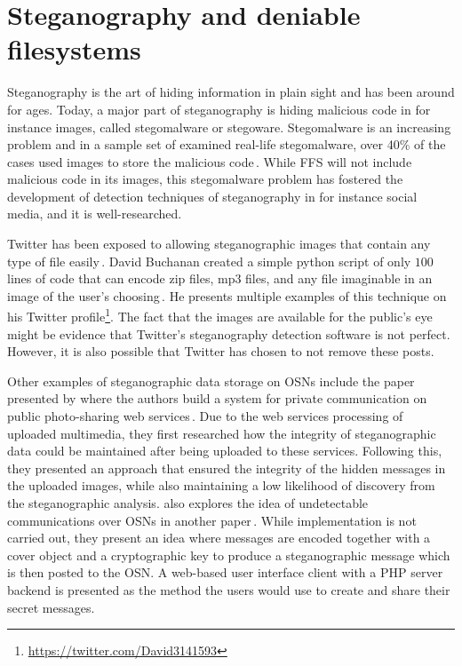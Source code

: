 \section{Steganography and deniable filesystems}
Steganography is the art of hiding information in plain sight and has been around for ages. Today, a major part of steganography is hiding malicious code in for instance images, called stegomalware or stegoware. Stegomalware is an increasing problem and in a sample set of examined \mbox{real-life} stegomalware, over 40\% of the cases used images to store the malicious code\,\cite{stichtingcuingfoundationSIMARGLStegwarePrimer2020}. While \gls{FFS} will not include malicious code in its images, this stegomalware problem has fostered the development of detection techniques of steganography in for instance social media, and it is \mbox{well-researched}. 

Twitter has been exposed to allowing steganographic images that contain any type of file easily\,\cite{TwitterImagesCan}. David Buchanan created a simple python script of only $100$ lines of code that can encode zip files, mp3 files, and any file imaginable in an image of the user's choosing\,\cite{buchananTweetablepolyglotpng2022}. He presents multiple examples of this technique on his Twitter profile\footnote{\url{https://twitter.com/David3141593}}. The fact that the images are available for the public's eye might be evidence that Twitter's steganography detection software is not perfect. However, it is also possible that Twitter has chosen to not remove these posts.

Other examples of steganographic data storage on \gls{OSN}s include the paper presented by \citeauthor{ningSecretMessageSharing2014} where the authors build a system for private communication on public \mbox{photo-sharing} web services\,\cite{ningSecretMessageSharing2014}. Due to the web services processing of uploaded multimedia, they first researched how the integrity of steganographic data could be maintained after being uploaded to these services. Following this, they presented an approach that ensured the integrity of the hidden messages in the uploaded images, while also maintaining a low likelihood of discovery from the steganographic analysis. \citeauthor{beatoUndetectableCommunicationOnline2014} also explores the idea of undetectable communications over \gls{OSN}s in another paper\,\cite{beatoUndetectableCommunicationOnline2014}. While implementation is not carried out, they present an idea where messages are encoded together with a cover object and a cryptographic key to produce a steganographic message which is then posted to the \gls{OSN}. A \mbox{web-based} user interface client with a PHP server backend is presented as the method the users would use to create and share their secret messages.

